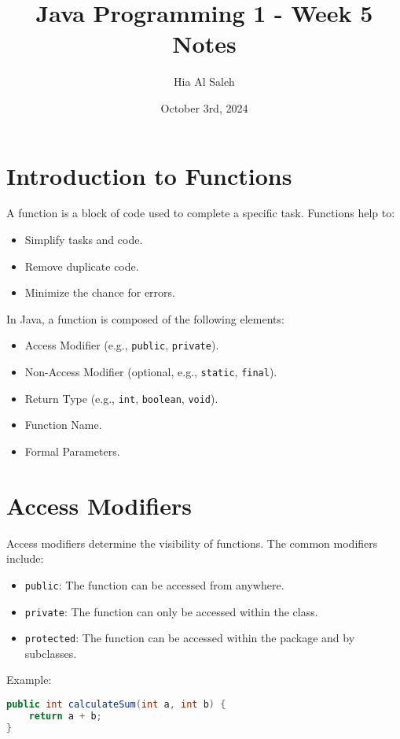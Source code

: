 \documentclass{article}
\title{Java Programming 1 - Week 5 Notes}
\author{Hia Al Saleh}
\date{October 3rd, 2024}
\begin{document}
\maketitle
\tableofcontents
\newpage

\section{Introduction to Functions}
A function is a block of code used to complete a specific task. Functions help to:
\begin{itemize}
    \item Simplify tasks and code.
    \item Remove duplicate code.
    \item Minimize the chance for errors.
\end{itemize}

In Java, a function is composed of the following elements:
\begin{itemize}
    \item Access Modifier (e.g., \texttt{public}, \texttt{private}).
    \item Non-Access Modifier (optional, e.g., \texttt{static}, \texttt{final}).
    \item Return Type (e.g., \texttt{int}, \texttt{boolean}, \texttt{void}).
    \item Function Name.
    \item Formal Parameters.
\end{itemize}

\section{Access Modifiers}
Access modifiers determine the visibility of functions. The common modifiers include:
\begin{itemize}
    \item \texttt{public}: The function can be accessed from anywhere.
    \item \texttt{private}: The function can only be accessed within the class.
    \item \texttt{protected}: The function can be accessed within the package and by subclasses.
\end{itemize}
Example:
\begin{lstlisting}[language=java]
public int calculateSum(int a, int b) {
    return a + b;
}
\end{lstlisting}
\end{document}
